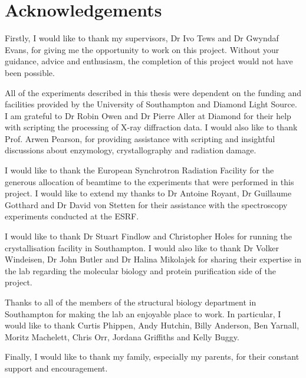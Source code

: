 \newpage
\thispagestyle{empty}
\mbox{}
\chapter*{Acknowledgements}
Firstly, I would like to thank my supervisors, Dr Ivo Tews and Dr Gwyndaf Evans, for giving me the opportunity to work on this project. Without your guidance, advice and enthusiasm, the completion of this project would not have been possible.

All of the experiments described in this thesis were dependent on the funding and facilities provided by the University of Southampton and Diamond Light Source. I am grateful to Dr Robin Owen and Dr Pierre Aller at Diamond for their help with scripting the processing of X-ray diffraction data. I would also like to thank Prof. Arwen Pearson, for providing assistance with scripting and insightful discussions about enzymology, crystallography and radiation damage.       

I would like to thank the European Synchrotron Radiation Facility for the generous allocation of beamtime to the experiments that were performed in this project. I would like to extend my thanks to Dr Antoine Royant, Dr Guillaume Gotthard and Dr David von Stetten for their assistance with the spectroscopy experiments conducted at the ESRF.

I would like to thank Dr Stuart Findlow and Christopher Holes for running the crystallisation facility in Southampton. I would also like to thank Dr Volker Windeisen, Dr John Butler and Dr Halina Mikolajek for sharing their expertise in the lab regarding the molecular biology and protein purification side of the project.

Thanks to all of the members of the structural biology department in Southampton for making the lab an enjoyable place to work. In particular, I would like to thank Curtis Phippen, Andy Hutchin, Billy Anderson, Ben Yarnall, Moritz Machelett, Chris Orr, Jordana Griffiths and Kelly Buggy.  

Finally, I would like to thank my family, especially my parents, for their constant support and encouragement.
\cleardoublepage